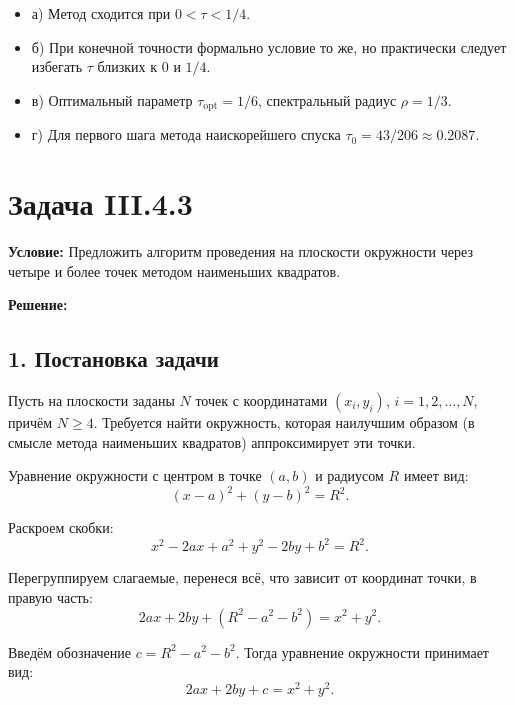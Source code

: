\documentclass{article}
\begin{document}
\begin{itemize}
\item а) Метод сходится при $0 < \tau < 1/4$.
\item б) При конечной точности формально условие то же, но практически следует избегать $\tau$ близких к 0 и $1/4$.
\item в) Оптимальный параметр $\tau_{\text{opt}} = 1/6$, спектральный радиус $\rho = 1/3$.
\item г) Для первого шага метода наискорейшего спуска $\tau_0 = 43/206 \approx 0.2087$.
\end{itemize}








\section*{Задача III.4.3}

\textbf{Условие:} Предложить алгоритм проведения на плоскости окружности через четыре и более точек методом наименьших квадратов.

\vspace{0.5cm}
\textbf{Решение:}

\subsection*{1. Постановка задачи}

Пусть на плоскости заданы $N$ точек с координатами $(x_i, y_i)$, $i = 1, 2, \ldots, N$, причём $N \geqslant 4$. Требуется найти окружность, которая наилучшим образом (в смысле метода наименьших квадратов) аппроксимирует эти точки.

Уравнение окружности с центром в точке $(a, b)$ и радиусом $R$ имеет вид:
\begin{equation}
(x - a)^2 + (y - b)^2 = R^2.
\end{equation}

Раскроем скобки:
\begin{equation}
x^2 - 2ax + a^2 + y^2 - 2by + b^2 = R^2.
\end{equation}

Перегруппируем слагаемые, перенеся всё, что зависит от координат точки, в правую часть:
\begin{equation}
2ax + 2by + (R^2 - a^2 - b^2) = x^2 + y^2.
\end{equation}

Введём обозначение $c = R^2 - a^2 - b^2$. Тогда уравнение окружности принимает вид:
\begin{equation}
2ax + 2by + c = x^2 + y^2.
\label{eq:43_lin}
\end{equation}
\end{document}
